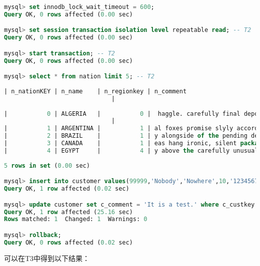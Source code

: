\documentclass{article}
\begin{document}
\begin{lstlisting}[language=sql]
mysql> set innodb_lock_wait_timeout = 600;
Query OK, 0 rows affected (0.00 sec)

mysql> set session transaction isolation level repeatable read; -- T2
Query OK, 0 rows affected (0.00 sec)

mysql> start transaction; -- T2
Query OK, 0 rows affected (0.00 sec)

mysql> select * from nation limit 5; -- T2
    
| n_nationKEY | n_name    | n_regionkey | n_comment
                              |
    
|           0 | ALGERIA   |           0 |  haggle. carefully final deposits detect slyly agai
                              |
|           1 | ARGENTINA |           1 | al foxes promise slyly according to the regular accounts. bold requests alon                                |
|           2 | BRAZIL    |           1 | y alongside of the pending deposits. carefully special packages are about the ironic forges. slyly special  |
|           3 | CANADA    |           1 | eas hang ironic, silent packages. slyly regular packages are furiously over the tithes. fluffily bold       |
|           4 | EGYPT     |           4 | y above the carefully unusual theodolites. final dugouts are quickly across the furiously regular d         |
    
5 rows in set (0.00 sec)

mysql> insert into customer values(99999,'Nobody','Nowhere',10,'12345678',3.14,'BUILDING','It is a test.'); -- T2
Query OK, 1 row affected (0.02 sec)

mysql> update customer set c_comment = 'It is a test.' where c_custkey = 1; -- T2
Query OK, 1 row affected (25.16 sec)
Rows matched: 1  Changed: 1  Warnings: 0

mysql> rollback;
Query OK, 0 rows affected (0.02 sec)
\end{lstlisting}

可以在T3中得到以下结果：
\end{document}
